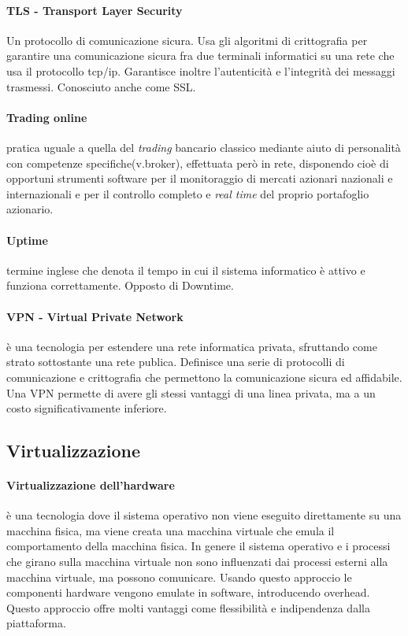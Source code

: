 \paragraph{TLS - Transport Layer Security}
Un protocollo di comunicazione sicura. Usa gli algoritmi di crittografia per garantire una comunicazione sicura fra due terminali informatici su una rete che usa il protocollo tcp/ip.
Garantisce inoltre l'autenticit\`a e l'integrit\`a dei messaggi trasmessi.
Conosciuto anche come SSL.
\paragraph{Trading online}
	pratica uguale a quella del \emph{trading} bancario classico mediante aiuto di personalità con competenze specifiche(v.broker), effettuata però in rete, disponendo cioè di opportuni strumenti software per il monitoraggio di mercati azionari nazionali e internazionali e  per il controllo completo e \emph{real time} del proprio portafoglio azionario.
\paragraph{Uptime}
    termine inglese che denota il tempo in cui il sistema informatico \`e attivo e funziona correttamente.
    Opposto di Downtime.


\paragraph{VPN - Virtual Private Network}
        \`e una tecnologia per estendere una rete informatica privata, sfruttando come strato sottostante una rete publica.
    Definisce una serie di protocolli di comunicazione e crittografia che permettono la comunicazione sicura ed affidabile.
    Una VPN permette di avere gli stessi vantaggi di una linea privata, ma a un costo significativamente inferiore.
\subsection{Virtualizzazione}
\paragraph{Virtualizzazione dell'hardware}
\`e una tecnologia dove il sistema operativo non viene eseguito direttamente su una macchina fisica, ma viene creata una macchina virtuale che emula il comportamento della macchina fisica. In genere il sistema operativo e i processi che girano sulla macchina virtuale non sono influenzati dai processi esterni alla macchina virtuale, ma possono comunicare.
Usando questo approccio le componenti hardware vengono emulate in software, introducendo overhead.
Questo approccio offre molti vantaggi come flessibilit\`a e indipendenza dalla piattaforma.
